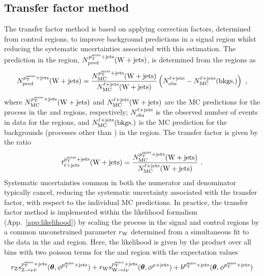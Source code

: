 \subsection{Transfer factor method}

The transfer factor method is based on applying correction factors, determined
from control regions, to improve background predictions in a signal region
whilst reducing the systematic uncertainties associated with this estimation.
The \IWj prediction in the \metplusjets region,
$N_{\mathrm{pred}}^{p_{\text{T}}^{\mathrm{miss}}+\mathrm{jets}}({\mathrm{W}+\mathrm{jets}})$, is determined from the \ellplusjets
regions as
%
\begin{equation}
    N_{\mathrm{pred}}^{p_{\text{T}}^{\mathrm{miss}}+\mathrm{jets}}({\mathrm{W}+\mathrm{jets}}) = \frac{N_{\mathrm{MC}}^{p_{\text{T}}^{\mathrm{miss}}+\mathrm{jets}}({\mathrm{W}+\mathrm{jets}})}{N_{\mathrm{MC}}^{\ell+\mathrm{jets}}({\mathrm{W}+\mathrm{jets}})} \left(N_{\mathrm{obs}}^{\ell+\mathrm{jets}} - N_{\mathrm{MC}}^{\ell+\mathrm{jets}}(\mathrm{bkgs.})\right)\ ,
\end{equation}
%
where $N_{\mathrm{MC}}^{p_{\text{T}}^{\mathrm{miss}}+\mathrm{jets}}({\mathrm{W}+\mathrm{jets}})$ and
$N_{\mathrm{MC}}^{\ell+\mathrm{jets}}({\mathrm{W}+\mathrm{jets}})$ are the MC predictions for the \IWj
process in the \metplusjets and \ellplusjets regions, respectively;
$N_{obs}^{\ell+\mathrm{jets}}$ is the observed number of events in data for the
\ellplusjets regions, and $N_{\mathrm{MC}}^{\ell+\mathrm{jets}}(\mathrm{bkgs.})$ is
the MC prediction for the backgrounds (processes other than \IWj) in the
\ellplusjets region. The transfer factor is given by the ratio
%
\begin{equation}
    t_{\ell+\mathrm{jets}}^{p_{\text{T}}^{\mathrm{miss}}+\mathrm{jets}}({\mathrm{W}+\mathrm{jets}}) = \frac{N_{\mathrm{MC}}^{p_{\text{T}}^{\mathrm{miss}}+\mathrm{jets}}({\mathrm{W}+\mathrm{jets}})}{N_{\mathrm{MC}}^{\ell+\mathrm{jets}}({\mathrm{W}+\mathrm{jets}})}\ .
\end{equation}
%
Systematic uncertainties common in both the numerator and denominator
typically cancel, reducing the systematic uncertainty associated with the
transfer factor, with respect to the individual MC predictions. In practice,
the transfer factor method is implemented within the likelihood formalism
(App.~\ref{app:likelihood}) by scaling the \IWj process in the signal and
control regions by a common unconstrained parameter $r_{\mathrm{W}}$ determined
from a simultaneous fit to the data in the \metplusjets and \ellplusjets
region. Here, the likelihood is given by the product over all \recoil bins
with two poisson terms for the \metplusjets and \ellplusjets region with the
expectation values
%
\begin{equation}
    r_{\PZ}s_{\IZvv}^{\metplusjets}(\bm{\theta},\phi^{\metplusjets})%
    + r_{\PW}s_{\IWlv}^{\metplusjets}(\bm{\theta},\phi^{\muplusjets})%
    + b^{\metplusjets}(\bm{\theta},\phi^{\metplusjets})
\end{equation}

